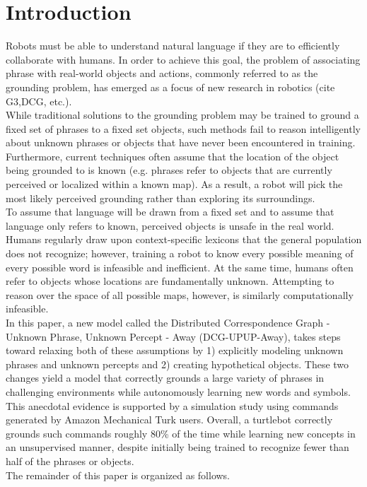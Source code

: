 \section{Introduction}
Robots must be able to understand natural language if they are to efficiently collaborate with humans.
In order to achieve this goal, the problem of associating phrase with real-world objects and actions, commonly referred to as the grounding problem, has emerged as a focus of new research in robotics (cite G3,DCG, etc.).\\
\indent While traditional solutions to the grounding problem may be trained to ground a fixed set of phrases to a fixed set objects, such methods fail to reason intelligently about unknown phrases or objects that have never been encountered in training.
Furthermore, current techniques often assume that the location of the object being grounded to is known (e.g. phrases refer to objects that are currently perceived or localized within a known map).
As a result, a robot will pick the most likely perceived grounding rather than exploring its surroundings.\\
\indent To assume that language will be drawn from a fixed set and to assume that language only refers to known, perceived objects is unsafe in the real world.
Humans regularly draw upon context-specific lexicons that the general population does not recognize; however, training a robot to know every possible meaning of every possible word is infeasible and inefficient.
At the same time, humans often refer to objects whose locations are fundamentally unknown.
Attempting to reason over the space of all possible maps, however, is similarly computationally infeasible.\\
\indent In this paper, a new model called the Distributed Correspondence Graph - Unknown Phrase, Unknown Percept - Away (DCG-UPUP-Away), takes steps toward relaxing both of these assumptions by 1) explicitly modeling unknown phrases and unknown percepts and 2) creating hypothetical objects.
These two changes yield a model that correctly grounds a large variety of phrases in challenging environments while autonomously learning new words and symbols.
This anecdotal evidence is supported by a simulation study using commands generated by Amazon Mechanical Turk users.
Overall, a turtlebot correctly grounds such commands roughly 80\% of the time while learning new concepts in an unsupervised manner, despite initially being trained to recognize fewer than half of the phrases or objects.\\
\indent The remainder of this paper is organized as follows.

